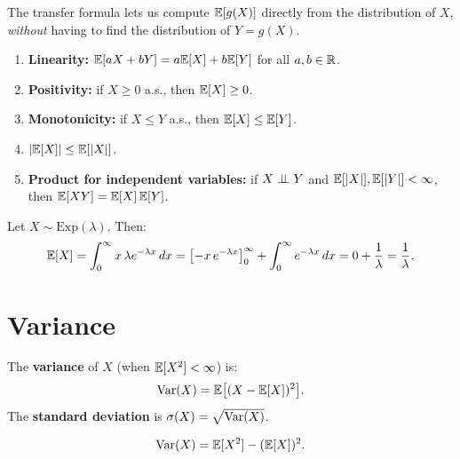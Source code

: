 \begin{intuition}[title=\textbf{Why LOTUS is so useful}]
The transfer formula lets us compute $\mathbb{E}[g(X)]$ directly from the distribution of
$X$, \emph{without} having to find the distribution of $Y = g(X)$.
\end{intuition}

\begin{theorem}
\label{thm:exp_properties}
\begin{enumerate}[label=(\roman*)]
    \item \textbf{Linearity:} $\mathbb{E}[aX + bY] = a\mathbb{E}[X] + b\mathbb{E}[Y]$ for all
          $a, b \in \mathbb{R}$.
    \item \textbf{Positivity:} if $X \geq 0$ a.s., then $\mathbb{E}[X] \geq 0$.
    \item \textbf{Monotonicity:} if $X \leq Y$ a.s., then $\mathbb{E}[X] \leq \mathbb{E}[Y]$.
    \item $\left| \mathbb{E}[X] \right| \leq \mathbb{E}[\left| X \right|]$.
    \item \textbf{Product for independent variables:}
          if $X \perp\!\!\!\perp Y$ and $\mathbb{E}[\left| X \right|], \mathbb{E}[\left| Y \right|] < \infty$, then
          $\mathbb{E}[XY] = \mathbb{E}[X]\,\mathbb{E}[Y]$.
\end{enumerate}
\end{theorem}

\begin{example}
Let $X \sim \mathrm{Exp}(\lambda)$. Then:
\[
    \mathbb{E}[X] = \int_0^{\infty} x\,\lambda e^{-\lambda x}\,dx
    = \left[-x\,e^{-\lambda x}\right]_0^{\infty}
    + \int_0^{\infty} e^{-\lambda x}\,dx
    = 0 + \frac{1}{\lambda} = \frac{1}{\lambda}.
\]
\end{example}

\section{Variance}

\begin{definition}
The \textbf{variance} of $X$ (when $\mathbb{E}[X^2] < \infty$) is:
\[
    \mathrm{Var}(X) = \mathbb{E}\bigl[(X - \mathbb{E}[X])^2\bigr].
\]
The \textbf{standard deviation} is $\sigma(X) = \sqrt{\mathrm{Var}(X)}$.
\end{definition}

\begin{theorem}
\label{thm:konig}
\[
    \mathrm{Var}(X) = \mathbb{E}[X^2] - (\mathbb{E}[X])^2.
\]
\end{theorem}

